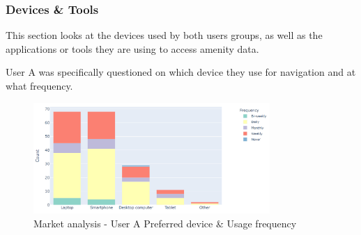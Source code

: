 \subsubsection{Devices \& Tools}
This section looks at the devices used by both users groups, as well as the applications or tools they are using to access amenity data.

User A was specifically questioned on which device they use for navigation and at what frequency.
\begin{figure}[h!]
    \centering
    \includegraphics[width=0.8\textwidth]{images/mr-usera-device-freq.png}
    \caption{Market analysis - User A Preferred device \& Usage frequency}
\end{figure}


